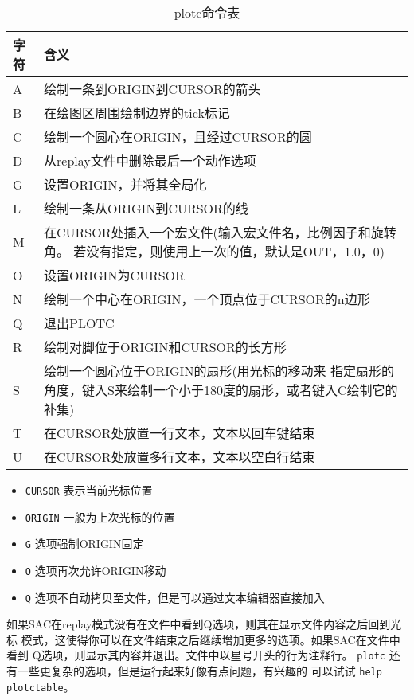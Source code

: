 \begin{table}[!ht]
\centering
\ttfamily
\small
\caption{plotc命令表}
\begin{tabular}{p{1cm}p{10cm}}
	\toprule
	字符	& 	含义	\\
	\midrule
	A		&	绘制一条到ORIGIN到CURSOR的箭头	\\
	B		&	在绘图区周围绘制边界的tick标记  \\
	C		&	绘制一个圆心在ORIGIN，且经过CURSOR的圆	\\
	D		&	从replay文件中删除最后一个动作选项	\\
	G		&	设置ORIGIN，并将其全局化	\\
	L		& 	绘制一条从ORIGIN到CURSOR的线	\\
	M		&	在CURSOR处插入一个宏文件(输入宏文件名，比例因子和旋转角。
                若没有指定，则使用上一次的值，默认是OUT，1.0，0)\\
	O		&	设置ORIGIN为CURSOR		\\
	N		&	绘制一个中心在ORIGIN，一个顶点位于CURSOR的n边形 \\
	Q		&	退出PLOTC	\\
	R		&	绘制对脚位于ORIGIN和CURSOR的长方形	\\
	S		&	绘制一个圆心位于ORIGIN的扇形(用光标的移动来
                指定扇形的角度，键入S来绘制一个小于180度的扇形，或者键入C绘制它的补集)\\
	T		&	在CURSOR处放置一行文本，文本以回车键结束	\\
	U		&	在CURSOR处放置多行文本，文本以空白行结束	\\
	\bottomrule
\end{tabular}
\end{table}
\begin{itemize}
\item \texttt{CURSOR} 表示当前光标位置
\item \texttt{ORIGIN} 一般为上次光标的位置
\item \texttt{G} 选项强制ORIGIN固定
\item \texttt{O} 选项再次允许ORIGIN移动
\item \texttt{Q} 选项不自动拷贝至文件，但是可以通过文本编辑器直接加入
\end{itemize}
如果SAC在replay模式没有在文件中看到Q选项，则其在显示文件内容之后回到光标
模式，这使得你可以在文件结束之后继续增加更多的选项。如果SAC在文件中看到
Q选项，则显示其内容并退出。文件中以星号开头的行为注释行。
\texttt{plotc} 还有一些更复杂的选项，但是运行起来好像有点问题，有兴趣的
可以试试 \texttt{help plotctable}。
